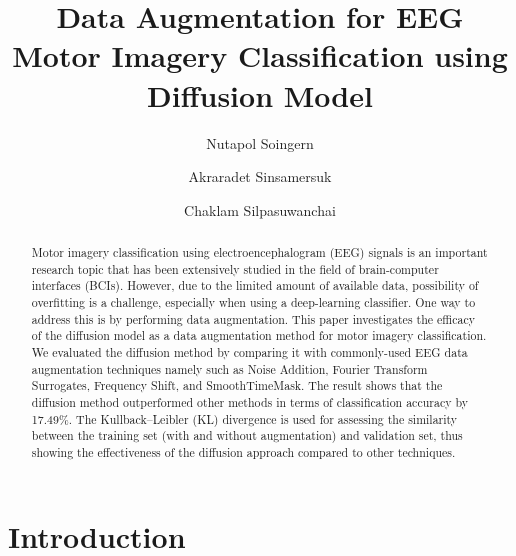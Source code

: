 \documentclass[runningheads]{llncs}
\begin{document}
\title{Data Augmentation for EEG Motor Imagery Classification using Diffusion Model}
%
%
\author{Nutapol Soingern \and
Akraradet Sinsamersuk\and
Chaklam Silpasuwanchai  }
%
%
%
\maketitle              %
%
\begin{abstract}
\begin{sloppypar}
  Motor imagery classification using electroencephalogram (EEG) signals is an important research topic that has been extensively studied in the field of brain-computer interfaces (BCIs). However, due to the limited amount of available data, possibility of overfitting is a challenge, especially when using a deep-learning classifier. One way to address this is by performing data augmentation. This paper investigates the efficacy of the diffusion model as a data augmentation method for motor imagery classification. We evaluated the diffusion method by comparing it with commonly-used EEG data augmentation techniques namely such as Noise Addition,
  Fourier Transform Surrogates, Frequency Shift, and SmoothTimeMask. The result shows that the diffusion method outperformed other methods in terms of classification accuracy by 17.49\%. The Kullback–Leibler (KL) divergence is used for assessing the similarity between the training set (with and without augmentation) and validation set, thus showing the effectiveness of the diffusion approach compared to other techniques.
\end{sloppypar}

\end{abstract}
%
%
%
\section{Introduction}
\end{document}
